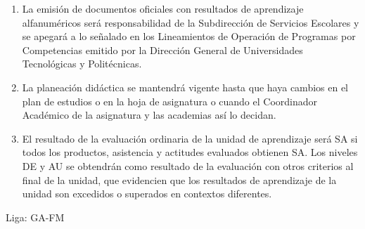 \documentclass[10pt,letterpaper]{article}
\begin{document}
\begin{enumerate}
		\item La emisión de documentos oficiales con resultados de aprendizaje alfanuméricos será responsabilidad de la Subdirección de Servicios Escolares y se apegará a lo señalado en los Lineamientos de Operación de Programas por Competencias emitido por la Dirección General de Universidades Tecnológicas y Politécnicas.
		
		\item La planeación didáctica se mantendrá vigente hasta que haya cambios en el plan de estudios o en la hoja de asignatura o cuando el Coordinador Académico de la asignatura y las academias así lo decidan.
		
		\item El resultado de la evaluación ordinaria de la unidad de aprendizaje será SA si todos los productos, asistencia y actitudes evaluados obtienen SA. Los niveles DE y AU se obtendrán como resultado de la evaluación con otros criterios al final de la unidad, que evidencien que los resultados de aprendizaje de la unidad son excedidos o superados en contextos diferentes.
	\end{enumerate}
	
	\vspace{1.5cm}
	
	
	\vspace{1.5cm}
	
	\begin{center}
		{\small Liga: GA-FM}
	\end{center}
	
\end{document}
